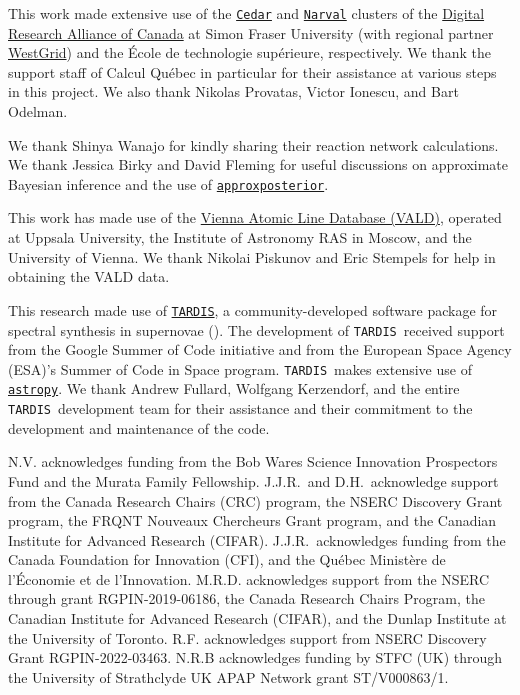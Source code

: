 \documentclass[twocolumn, twocolappendix]{aastex63}
\def\TARDIS{\texttt{TARDIS}}
\def\approxposterior{\texttt{approxposterior}}
\begin{document}
This work made extensive use of the \href{https://docs.alliancecan.ca/wiki/Cedar}{\texttt{Cedar}} and \href{https://docs.alliancecan.ca/wiki/Narval/en}{\texttt{Narval}} clusters of the \href{https://alliancecan.ca/en}{Digital Research Alliance of Canada} at Simon Fraser University (with regional partner \href{https://www.westgrid.ca/}{WestGrid}) and the {\'E}cole de technologie sup{\'e}rieure, respectively. We thank the support staff of Calcul Qu{\'e}bec in particular for their assistance at various steps in this project. We also thank Nikolas Provatas, Victor Ionescu, and Bart Odelman.

We thank Shinya Wanajo for kindly sharing their reaction network calculations. We thank Jessica Birky and David Fleming for useful discussions on approximate Bayesian inference and the use of \href{https://dflemin3.github.io/approxposterior/index.html}{\approxposterior}.

This work has made use of the \href{http://vald.astro.uu.se/~vald/php/vald.php}{Vienna Atomic Line Database (VALD)}, operated at Uppsala University, the Institute of Astronomy RAS in Moscow, and the University of Vienna. We thank Nikolai Piskunov and Eric Stempels for help in obtaining the VALD data.

This research made use of \href{https://tardis-sn.github.io/tardis/index.html}{\TARDIS}, a community-developed software package for spectral synthesis in supernovae (\citealt{kerzendorf14}). The development of \TARDIS~received support from the Google Summer of Code initiative and from the European Space Agency (ESA)'s Summer of Code in Space program. \TARDIS~makes extensive use of \href{https://docs.astropy.org/en/stable/}{\texttt{astropy}}. We thank Andrew Fullard, Wolfgang Kerzendorf, and the entire \TARDIS~development team for their assistance and their commitment to the development and maintenance of the code. 

N.V. acknowledges funding from the Bob Wares Science Innovation Prospectors Fund and the Murata Family Fellowship. J.J.R.\ and D.H.\ acknowledge support from the Canada Research Chairs (CRC) program, the NSERC Discovery Grant program, the FRQNT Nouveaux Chercheurs Grant program, and the Canadian Institute for Advanced Research (CIFAR). J.J.R.\ acknowledges funding from the Canada Foundation for Innovation (CFI), and the Qu\'{e}bec Ministère de l’\'{E}conomie et de l’Innovation. M.R.D. acknowledges support from the NSERC through grant RGPIN-2019-06186, the Canada Research Chairs Program, the Canadian Institute for Advanced Research (CIFAR), and the Dunlap Institute at the University of Toronto. R.F. acknowledges support from NSERC Discovery Grant RGPIN-2022-03463. N.R.B acknowledges funding by STFC (UK) through the University of Strathclyde
UK APAP Network grant ST/V000863/1.
\end{document}
